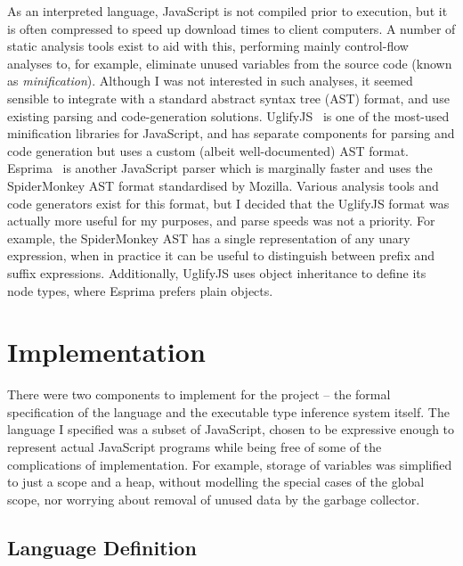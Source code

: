 \documentclass[12pt,a4paper,twoside,openright]{report}
\theoremstyle{definition}
\theoremstyle{dotless}
\begin{document}
As an interpreted language, JavaScript is not compiled prior to execution, but
it is often compressed to speed up download times to client computers. A number
of static analysis tools exist to aid with this, performing mainly control-flow
analyses to, for example, eliminate unused variables from the source code
(known as \textit{minification}). Although I was not interested in such
analyses, it seemed sensible to integrate with a standard abstract syntax tree
(AST) format, and use existing parsing and code-generation solutions.
UglifyJS~\cite{uglify} is one of the most-used minification libraries for
JavaScript, and has separate components for parsing and code generation but
uses a custom (albeit well-documented) AST format. Esprima~\cite{esprima} is
another JavaScript parser which is marginally faster and uses the SpiderMonkey
AST format standardised by Mozilla. Various analysis tools and code generators
exist for this format, but I decided that the UglifyJS format was actually more
useful for my purposes, and parse speeds was not a priority. For example, the
SpiderMonkey AST has a single representation of any unary expression, when in
practice it can be useful to distinguish between prefix and suffix expressions.
Additionally, UglifyJS uses object inheritance to define its node types, where
Esprima prefers plain objects. 

\chapter{Implementation}\label{implementation}

There were two components to implement for the project -- the formal
specification of the language and the executable type inference system itself.
The language I specified was a subset of JavaScript, chosen to be expressive
enough to represent actual JavaScript programs while being free of some of the
complications of implementation. For example, storage of variables was
simplified to just a scope and a heap, without modelling the special cases of
the global scope, nor worrying about removal of unused data by the garbage
collector. 

\section{Language Definition}
\end{document}
